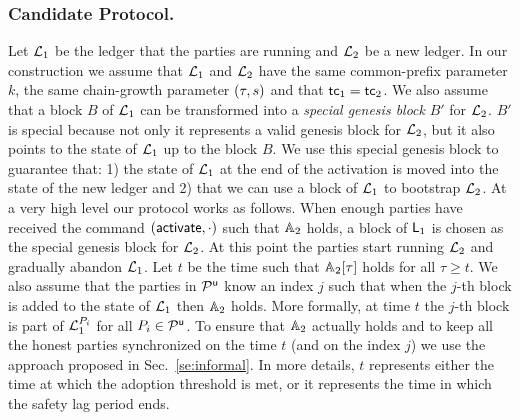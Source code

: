 \subsubsection{Candidate Protocol.}

Let $\mathcal{L}_1$ be the ledger that the parties are running and $\mathcal{L}_2$ be a new ledger.
In our construction we assume that $\mathcal{L}_1$ and $\mathcal{L}_2$ have the same common-prefix parameter $k$, the same chain-growth parameter $(\tau, s)$ and that $\mathsf{tc}_1=\mathsf{tc}_2$. We also assume that a block $B$ of $\mathcal{L}_1$ can be transformed into a \emph{special genesis block} $B'$ for $\mathcal{L}_2$. $B'$ is special because not only it represents a valid genesis block for $\mathcal{L}_2$, but it also points to the state of $\mathcal{L}_1$ up to the block $B$. 
We use this special genesis block to guarantee that: 1) the state of $\mathcal{L}_1$ at the end of the activation is moved into the state of the new ledger
and 2) that we can use a block of $\mathcal{L}_1$ to bootstrap $\mathcal{L}_2$.
At a very high level our protocol works as follows. When enough parties have received the command $(\mathsf{activate},\cdot)$ such that $\mathbb{A}_2$ holds,
a block of $\mathsf{L}_1$ is chosen as the special genesis block for $\mathcal{L}_2$. At this point the parties start running $\mathcal{L}_2$ and gradually abandon 
$\mathcal{L}_1$.
Let $t$ be the time such that  $\mathbb{A}_2[\tau]$ holds for all $\tau\geq t$.
We also assume that the parties in $\mathcal{P}^\mathsf{u}$ know an index $j$ such that when the $j$-th block is added to the  state of $\mathcal{L}_1$ then $\mathbb{A}_2$ holds. 
More formally, at time $t$ the $j$-th block is part of  $\mathcal{L}_1^{P_i}$ for all $P_i\in\mathcal{P}^\mathsf{u}$.
To ensure that $\mathbb{A}_2$ actually holds and to keep all the honest parties synchronized on the time $t$ (and on the index $j$) we use the approach proposed in Sec.~\ref{se:informal}.
In more details, $t$ represents either the time at which the adoption threshold is met, or it represents the time in which the safety lag period ends.
 
 

